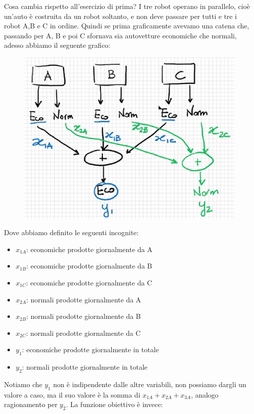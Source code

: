 \noindent Cosa cambia rispetto all'esercizio di prima? I tre robot operano in parallelo, cioè un'auto è costruita da un robot soltanto, e non deve passare per tutti e tre i robot A,B e C in ordine. Quindi se prima graficamente avevamo una catena che, passando per A, B e poi C sfornava sia autovetture economiche che normali, adesso abbiamo il seguente grafico:
\begin{figure}[h!]
    \centering
    \includegraphics[scale=0.5]{esercizioauto2.png}
\end{figure}
Dove abbiamo definito le seguenti incognite:
\begin{itemize}
    \item $x_{1A}$: economiche prodotte giornalmente da A
    \item $x_{1B}$: economiche prodotte giornalmente da B
    \item $x_{1C}$: economiche prodotte giornalmente da C
    \item $x_{2A}$: normali prodotte giornalmente da A
    \item $x_{2B}$: normali prodotte giornalmente da B
    \item $x_{2C}$: normali prodotte giornalmente da C
    \item $y_1$: economiche prodotte giornalmente in totale
    \item $y_2$: normali prodotte giornalmente in totale
\end{itemize}
Notiamo che $y_1$ non è indipendente dalle altre variabili, non possiamo dargli un valore a caso, ma il suo valore è la somma di $x_{1A} + x_{2A} + x_{3A}$, analogo ragionamento per $y_2$. La funzione obiettivo è invece:
